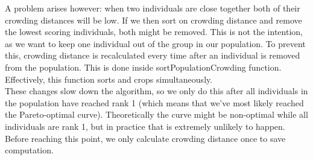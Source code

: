 A problem arises however: when two individuals are close together both of their crowding distances will be low. If we then sort on crowding distance and remove the lowest scoring individuals, both might be removed. This is not the intention, as we want to keep one individual out of the group in our population. To prevent this, crowding distance is recalculated every time after an individual is removed from the population. This is done inside sortPopulationCrowding function. Effectively, this function sorts and crops simultaneously.\\
These changes slow down the algorithm, so we only do this after all individuals in the population have reached rank 1 (which means that we've most likely reached the Pareto-optimal curve). Theoretically the curve might be non-optimal while all individuals are rank 1, but in practice that is extremely unlikely to happen. Before reaching this point, we only calculate crowding distance once to save computation.

